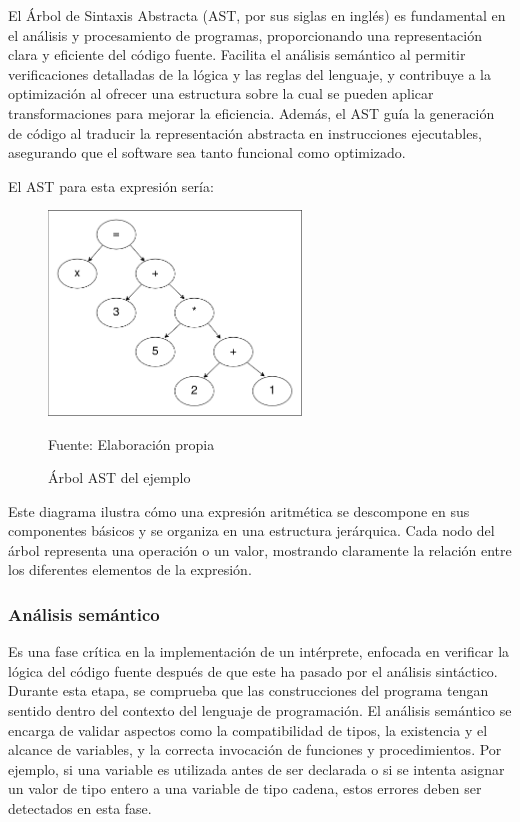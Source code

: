El Árbol de Sintaxis Abstracta (AST, por sus siglas en inglés) es fundamental en el análisis y procesamiento de programas, proporcionando una representación clara y eficiente del código fuente. Facilita el análisis semántico al permitir verificaciones detalladas de la lógica y las reglas del lenguaje, y contribuye a la optimización al ofrecer una estructura sobre la cual se pueden aplicar transformaciones para mejorar la eficiencia. Además, el AST guía la generación de código al traducir la representación abstracta en instrucciones ejecutables, asegurando que el software sea tanto funcional como optimizado.

El AST para esta expresión sería:

\begin{figure}[!h]
  \centering
  \includegraphics[width=0.6\textwidth]{images/ast_ejemplo.png}
  \caption{Árbol AST del ejemplo}
  \centering Fuente: Elaboración propia
  \label{fig:ast_ejemplo}
\end{figure}

Este diagrama ilustra cómo una expresión aritmética se descompone en sus componentes básicos y se organiza en una estructura jerárquica. Cada nodo del árbol representa una operación o un valor, mostrando claramente la relación entre los diferentes elementos de la expresión.

\subsubsection{Análisis semántico}
Es una fase crítica en la implementación de un intérprete, enfocada en verificar la lógica del código fuente después de que este ha pasado por el análisis sintáctico. Durante esta etapa, se comprueba que las construcciones del programa tengan sentido dentro del contexto del lenguaje de programación. El análisis semántico se encarga de validar aspectos como la compatibilidad de tipos, la existencia y el alcance de variables, y la correcta invocación de funciones y procedimientos. Por ejemplo, si una variable es utilizada antes de ser declarada o si se intenta asignar un valor de tipo entero a una variable de tipo cadena, estos errores deben ser detectados en esta fase.

